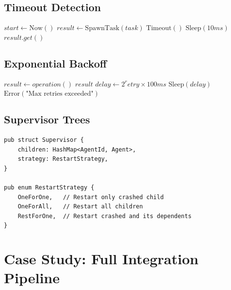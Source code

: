 \subsection{Timeout Detection}

\begin{algorithm}
\caption{Timeout Handling}
\begin{algorithmic}[1]
    \State $start \gets \text{Now}()$
    \State $result \gets \text{SpawnTask}(task)$
            \State \Return $\text{Timeout}()$
        \EndIf
        \State $\text{Sleep}(10ms)$
    \EndWhile
    \State \Return $result.get()$
\EndProcedure
\end{algorithmic}
\end{algorithm}

\subsection{Exponential Backoff}

\begin{algorithm}
\caption{Exponential Backoff Retry}
\begin{algorithmic}[1]
        \State $result \gets operation()$
            \State \Return $result$
        \EndIf
        \State $delay \gets 2^retry \times 100ms$
        \State $\text{Sleep}(delay)$
    \EndFor
    \State \Return $\text{Error}(\text{"Max retries exceeded"})$
\EndProcedure
\end{algorithmic}
\end{algorithm}

\subsection{Supervisor Trees}

\begin{verbatim}
pub struct Supervisor {
    children: HashMap<AgentId, Agent>,
    strategy: RestartStrategy,
}

pub enum RestartStrategy {
    OneForOne,   // Restart only crashed child
    OneForAll,   // Restart all children
    RestForOne,  // Restart crashed and its dependents
}
\end{verbatim}

\section{Case Study: Full Integration Pipeline}


